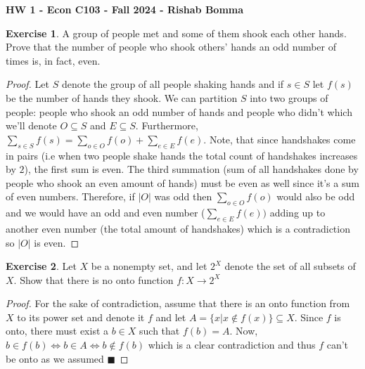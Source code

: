 \documentclass[11pt,oneside]{article}
\numberwithin{equation}{section}
\theoremstyle{definition}
\newtheorem{exercise}{Exercise}
\newcommand{\IFF}{\Longleftrightarrow}
\newcommand{\QED}{\blacksquare}
\begin{document}
\textbf{HW 1 - Econ C103 - Fall 2024 - Rishab Bomma}


\begin{exercise}

A group of people met and some of them shook each other hands. Prove that the number of people who shook others’ hands an odd number of times is, in fact, even.



\end{exercise}

\begin{proof}

Let $S$ denote the group of all people shaking hands and if $s \in S$ let $f(s)$ be the number of hands they shook. We can partition $S$ into two groups of people: people who shook an odd number of hands and people who didn't which we'll denote $O \subseteq S$ and $E \subseteq S$. Furthermore, $\sum_{s \in S} f(s) = \sum_{o \in O} f(o) + \sum_{e \in E} f(e)$. Note, that since handshakes come in pairs (i.e when two people shake hands the total count of handshakes increases by $2$), the first sum is even. The third summation (sum of all handshakes done by people who shook an even amount of hands) must be even as well since it's a sum of even numbers. Therefore, if $|O|$ was odd then $\sum_{o \in O} f(o)$ would also be odd and we would have an odd and even number ($\sum_{e \in E} f(e))$ adding up to another even number (the total amount of handshakes) which is a contradiction so $|O|$ is even. 

\end{proof}

\begin{exercise}

Let $X$ be a nonempty set, and let $2^X$ denote the set of all subsets of $X$. Show that there is no onto function $f: X \to 2^X$

\end{exercise}



\begin{proof}

For the sake of contradiction, assume that there is an onto function from $X$ to its power set and denote it $f$ and let $A = \{x | x \notin f(x) \} \subseteq X$. Since $f$ is onto, there must exist a $b \in X$ such that $f(b) = A$. Now, $b \in f(b) \IFF b \in A \IFF b \notin f(b)$ which is a clear contradiction and thus $f$ can't be onto as we assumed $\QED$ 

\end{proof}
\end{document}
